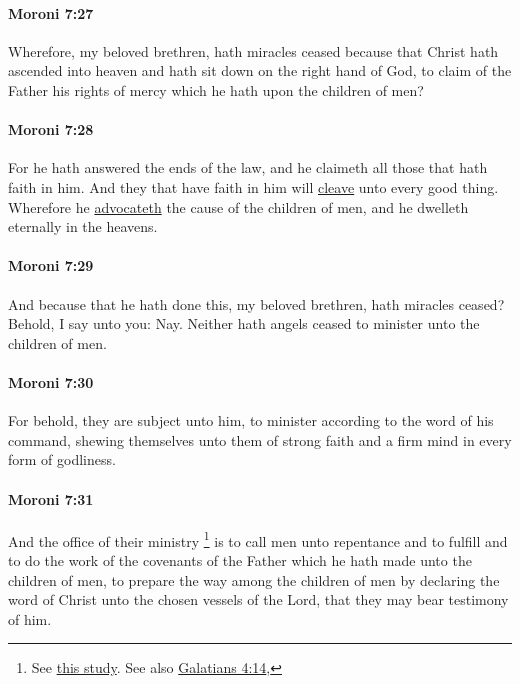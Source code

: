 		\paragraph{Moroni 7:27} %
			\label{MORONI-7-27}

			Wherefore, my beloved brethren, hath miracles ceased
			because that Christ hath ascended into heaven
			and hath sit down on the right hand of God,
			to claim of the Father his rights of mercy
			which he hath upon the children of men?

		\paragraph{Moroni 7:28} %
			\label{MORONI-7-28}

			For he hath answered the ends of the law,
			and he claimeth all those that hath faith in him.
			And they that have faith in him will \hyperref[CLEAVE]{cleave} unto every good thing.
			Wherefore he \hyperref[ADVOCATE]{advocateth} the cause of the children of men,
			and he dwelleth eternally in the heavens.

		\paragraph{Moroni 7:29} %
			\label{MORONI-7-29}

			And because that he hath done this, my beloved brethren,
			hath miracles ceased?
			Behold, I say unto you: Nay.
			Neither hath angels ceased to minister unto the children of men.

		\paragraph{Moroni 7:30} %
			\label{MORONI-7-30}

			For behold, they are subject unto him,
			to minister according to the word of his command,
			shewing themselves unto them of strong faith
			and a firm mind in every form of godliness.

		\paragraph{Moroni 7:31}
			\label{MORONI-7-31}
			
			And the office of their ministry%
				\footnote{%
					\label{MORONI-7-31-ministry}%
					See \hyperref[ANGEL-definition]{this study}. See also \hyperref[GALATIANS-4-14]{Galatians 4:14},
					}
			is to call men unto repentance
			and to fulfill and to do the work of the covenants of the Father
			which he hath made unto the children of men,
			to prepare the way among the children of men
			by declaring the word of Christ unto the chosen vessels of the Lord,
			that they may bear testimony of him.

